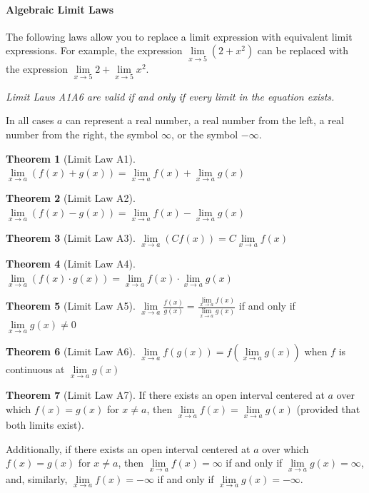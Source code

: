 \documentclass[10pt,oneside,]{book}
\theoremstyle{plain}
\theoremstyle{definition}
\numberwithin{equation}{section}
\newtheorem*{theorem*}{Theorem}
\newcommand{\fe}[2]{#1\mathopen{}\left(#2\right)\mathclose{}}
\begin{document}
\paragraph[Algebraic Limit Laws]{Algebraic Limit Laws}\label{paragraphs-76}
The following laws allow you to replace a limit expression with equivalent limit expressions. For example, the expression \(\lim\limits_{x\to5}\left(2+x^2\right)\) can be replaced with the expression \(\lim\limits_{x\to5}2+\lim\limits_{x\to5}x^2\).%
\par
\emph{Limit Laws A1\textendash{}A6 are valid if and only if every limit in the equation exists.}%
\par
In all cases \(a\) can represent a real number, a real number from the left, a real number from the right, the symbol \(\infty\), or the symbol \(-\infty\).%
\begin{theorem*}[Limit Law A1]\label{lla1}
\(\lim\limits_{x\to a}\left(\fe{f}{x}+\fe{g}{x}\right)=\lim\limits_{x\to a}\fe{f}{x}+\lim\limits_{x\to a}\fe{g}{x}\)%
\end{theorem*}
\begin{theorem*}[Limit Law A2]\label{lla2}
\(\lim\limits_{x\to a}\left(\fe{f}{x}-\fe{g}{x}\right)=\lim\limits_{x\to a}\fe{f}{x}-\lim\limits_{x\to a}\fe{g}{x}\)%
\end{theorem*}
\begin{theorem*}[Limit Law A3]\label{lla3}
\(\lim\limits_{x\to a}\left(C\fe{f}{x}\right)=C\lim\limits_{x\to a}\fe{f}{x}\)%
\end{theorem*}
\begin{theorem*}[Limit Law A4]\label{lla4}
\(\lim\limits_{x\to a}\left(\fe{f}{x}\cdot\fe{g}{x}\right)=\lim\limits_{x\to a}\fe{f}{x}\cdot\lim\limits_{x\to a}\fe{g}{x}\)%
\end{theorem*}
\begin{theorem*}[Limit Law A5]\label{lla5}
\(\lim\limits_{x\to a}\frac{\fe{f}{x}}{\fe{g}{x}}=\frac{\lim\limits_{x\to a}\fe{f}{x}}{\lim\limits_{x\to a}\fe{g}{x}}\) if and only if \(\lim\limits_{x\to a}\fe{g}{x}\neq0\)%
\end{theorem*}
\begin{theorem*}[Limit Law A6]\label{lla6}
\(\lim\limits_{x\to a}\fe{f}{\fe{g}{x}}=\fe{f}{\lim\limits_{x\to a}\fe{g}{x}}\) when \(f\) is continuous at \(\lim\limits_{x\to a}\fe{g}{x}\)%
\end{theorem*}
\begin{theorem*}[Limit Law A7]\label{lla7}
If there exists an open interval centered at \(a\) over which \(\fe{f}{x}=\fe{g}{x}\) for \(x\neq a\), then \(\lim\limits_{x\to a}\fe{f}{x}=\lim\limits_{x\to a}\fe{g}{x}\) (provided that both limits exist).%
\par
Additionally, if there exists an open interval centered at \(a\) over which \(\fe{f}{x}=\fe{g}{x}\) for \(x\neq a\), then \(\lim\limits_{x\to a}\fe{f}{x}=\infty\) if and only if \(\lim\limits_{x\to a}\fe{g}{x}=\infty\), and, similarly, \(\lim\limits_{x\to a}\fe{f}{x}=-\infty\) if and only if \(\lim\limits_{x\to a}\fe{g}{x}=-\infty\).%
\end{theorem*}
\typeout{************************************************}
\typeout{************************************************}
\end{document}
